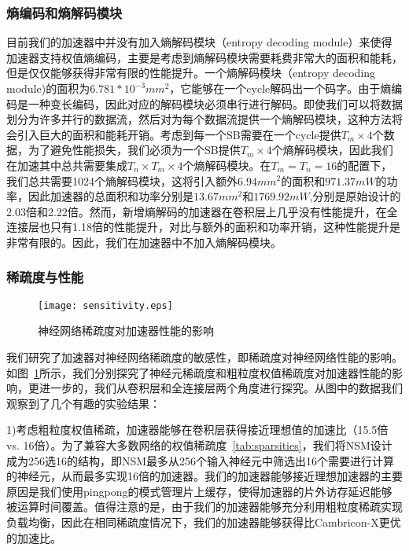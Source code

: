 \subsubsection{熵编码和熵解码模块}
目前我们的加速器中并没有加入熵解码模块（entropy decoding module）来使得加速器支持权值熵编码，主要是考虑到熵解码模块需要耗费非常大的面积和能耗，但是仅仅能够获得非常有限的性能提升。一个熵解码模块（entropy decoding module)的面积为$6.781*10^{-3}mm^2$，它能够在一个cycle解码出一个码字。由于熵编码是一种变长编码，因此对应的解码模块必须串行进行解码。即使我们可以将数据划分为许多并行的数据流，然后对为每个数据流提供一个熵解码模块，这种方法将会引入巨大的面积和能耗开销。考虑到每一个SB需要在一个cycle提供$T_m\times 4$个数据，为了避免性能损失，我们必须为一个SB提供$T_m\times 4$个熵解码模块，因此我们在加速其中总共需要集成$T_n\times T_m\times 4$个熵解码模块。在$T_m = T_n = 16$的配置下，我们总共需要1024个熵解码模块，这将引入额外$6.94mm^2$的面积和$971.37mW$的功率，因此加速器的总面积和功率分别是$13.67mm^2$和$1769.92mW$,分别是原始设计的2.03倍和2.22倍。然而，新增熵解码的加速器在卷积层上几乎没有性能提升，在全连接层也只有1.18倍的性能提升，对比与额外的面积和功率开销，这种性能提升是非常有限的。因此，我们在加速器中不加入熵解码模块。

\subsubsection{稀疏度与性能}
\begin{figure}[h]
\centering
\texttt{[image: sensitivity.eps]}
\caption{神经网络稀疏度对加速器性能的影响}
\label{fig:sensitivity}
\end{figure}



我们研究了加速器对神经网络稀疏度的敏感性，即稀疏度对神经网络性能的影响。如图~\ref{fig:sensitivity}所示，我们分别探究了神经元稀疏度和粗粒度权值稀疏度对加速器性能的影响，更进一步的，我们从卷积层和全连接层两个角度进行探究。从图中的数据我们观察到了几个有趣的实验结果：

1)考虑粗粒度权值稀疏，加速器能够在卷积层获得接近理想值的加速比（15.5倍 vs. 16倍）。为了兼容大多数网络的权值稀疏度~\ref{tab:sparsities}，我们将NSM设计成为256选16的结构，即NSM最多从256个输入神经元中筛选出16个需要进行计算的神经元，从而最多实现16倍的加速器。我们的加速器能够接近理想加速器的主要原因是我们使用pingpong的模式管理片上缓存，使得加速器的片外访存延迟能够被运算时间覆盖。值得注意的是，由于我们的加速器能够充分利用粗粒度稀疏实现负载均衡，因此在相同稀疏度情况下，我们的加速器能够获得比Cambricon-X更优的加速比。

